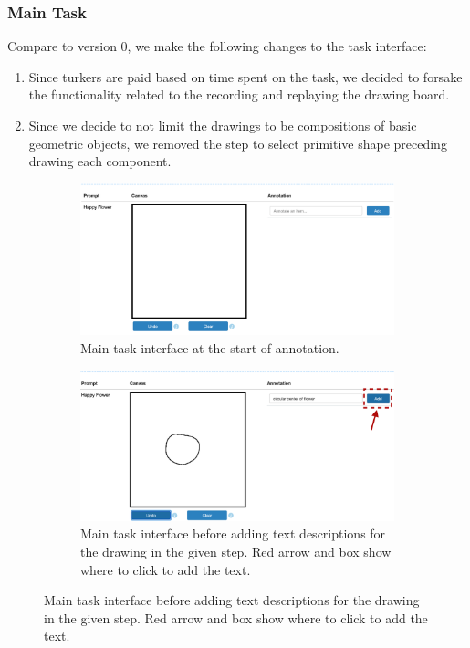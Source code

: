 \subsubsection{Main Task}
Compare to version 0, we make the following changes to the task interface: 
\begin{enumerate}
    \item Since turkers are paid based on time spent on the task, we decided to forsake the functionality related to the recording and replaying the drawing board.
    \item Since we decide to not limit the drawings to be compositions of basic geometric objects, we removed the step to select primitive shape preceding drawing each component.
\end{enumerate}

\begin{figure}[!htb]
\begin{subfigure}{\textwidth}
    \centering
    \includegraphics[width=.8\linewidth]{data_collection/v1_empty_table.png}  
    \caption{Main task interface at the start of annotation.}
    \label{v1.main_task.1.a}
\end{subfigure}
\newline
\begin{subfigure}{\textwidth}
    \centering
    \includegraphics[width=.8\linewidth]{data_collection/v1_before_enter_text.png}  
    \caption{Main task interface before adding text descriptions for the drawing in the given step. Red arrow and box show where to click to add the text.}
    \label{v1.main_task.1.b}
\end{subfigure}
\end{figure}

